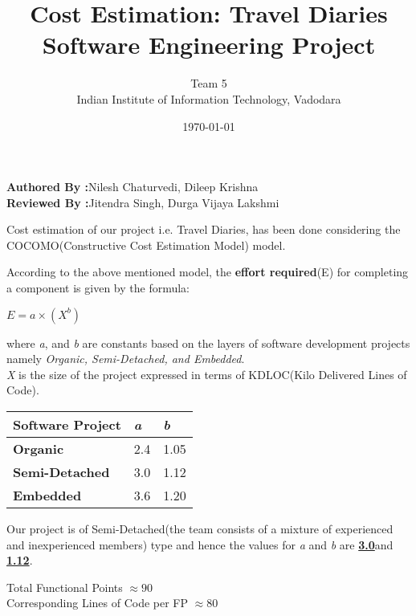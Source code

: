 \documentclass[12pt]{article}
\title{Cost Estimation: Travel Diaries\\Software Engineering Project }
\author{Team 5\\Indian Institute of Information Technology, Vadodara}
\date{\today}
\begin{document}
	\maketitle
	\begin{center}
		\textbf{\Large{Authored By :}}\Large{Nilesh Chaturvedi, Dileep Krishna}  \\
		\textbf{\Large{Reviewed By :}}\Large{Jitendra Singh, Durga Vijaya Lakshmi} \\[2\baselineskip]  
	\end{center}
	
	Cost estimation of our project i.e. Travel Diaries, has been done considering the COCOMO(Constructive Cost Estimation Model) model.
	
	According to the above mentioned model, the \textbf{effort required}(E) for completing a component is given by the formula:
	
	\begin{center}
		$ E= a\times (X^b)$
	\end{center}
	
	where \textit{a}, and \textit{b} are constants based on the layers of software development projects namely \textit{Organic, Semi-Detached, and Embedded}.\\
	\textit{X} is the size of the project expressed in terms of KDLOC(Kilo Delivered Lines of Code).\\
	\begin{center}
		\begin{tabular}{ | l | l | p{1cm} |}
			\hline
			\textbf{Software Project} & \textbf{\textit{a}} & \textbf{\textit{b}}  \\ \hline
			\textbf{Organic} & 2.4 & 1.05  \\ \hline
			\textbf{Semi-Detached} & 3.0 & 1.12 \\ \hline
			\textbf{Embedded} & 3.6 & 1.20 \\
			\hline
		\end{tabular}
	\end{center}
	
	Our project is of Semi-Detached(the team consists of a mixture of experienced and inexperienced members) type and hence the values for \textit{a} and \textit{b} are \textbf{\underline{3.0}}and  \textbf{\underline{1.12}}.
	
	\newpage
	
	\large{Total Functional Points $\approx 90$} \\
	
	\large{Corresponding Lines of Code per FP $\approx 80$}\\
	
\end{document}
